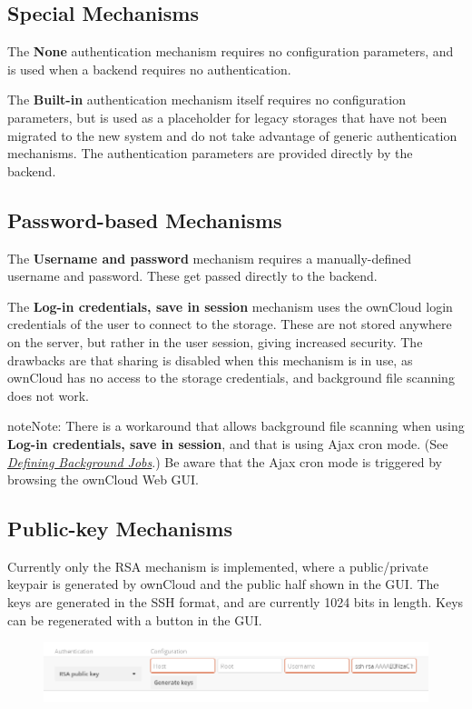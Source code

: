 \documentclass[letterpaper,10pt,english]{sphinxmanual}
\begin{document}
\subsection{Special Mechanisms}
\label{configuration_files/external_storage/auth_mechanisms:special-mechanisms}
The \textbf{None} authentication mechanism requires no configuration parameters, and
is used when a backend requires no authentication.

The \textbf{Built-in} authentication mechanism itself requires no configuration
parameters, but is used as a placeholder for legacy storages that have not been
migrated to the new system and do not take advantage of generic authentication
mechanisms. The authentication parameters are provided directly by the backend.


\subsection{Password-based Mechanisms}
\label{configuration_files/external_storage/auth_mechanisms:password-auth-workaround-label}\label{configuration_files/external_storage/auth_mechanisms:password-based-mechanisms}
The \textbf{Username and password} mechanism requires a manually-defined username and
password. These get passed directly to the backend.

The \textbf{Log-in credentials, save in session} mechanism uses the ownCloud login
credentials of the user to connect to the storage. These are not stored anywhere
on the server, but rather in the user session, giving increased security. The
drawbacks are that sharing is disabled when this mechanism is in use, as
ownCloud has no access to the storage credentials, and background file scanning
does not work.

\begin{notice}{note}{Note:}
There is a workaround that allows background file scanning when using
\textbf{Log-in credentials, save in session}, and that is using Ajax cron mode.
(See {\hyperref[configuration_server/background_jobs_configuration::doc]{\emph{Defining Background Jobs}}}.) Be
aware that the Ajax cron mode is triggered by browsing the ownCloud Web GUI.
\end{notice}


\subsection{Public-key Mechanisms}
\label{configuration_files/external_storage/auth_mechanisms:public-key-mechanisms}
Currently only the RSA mechanism is implemented, where a public/private
keypair is generated by ownCloud and the public half shown in the GUI. The keys
are generated in the SSH format, and are currently 1024 bits in length. Keys
can be regenerated with a button in the GUI.
\begin{figure}[htbp]
\centering

\includegraphics{auth_rsa.png}
\end{figure}
\end{document}
